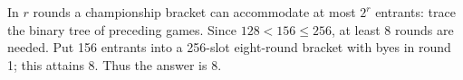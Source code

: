 In $r$ rounds a championship bracket can accommodate at most $2^r$ entrants: trace the binary tree of preceding games. Since $128<156\le256$, at least 8 rounds are needed. Put 156 entrants into a 256-slot eight-round bracket with byes in round 1; this attains 8. Thus the answer is $\boxed8$.

